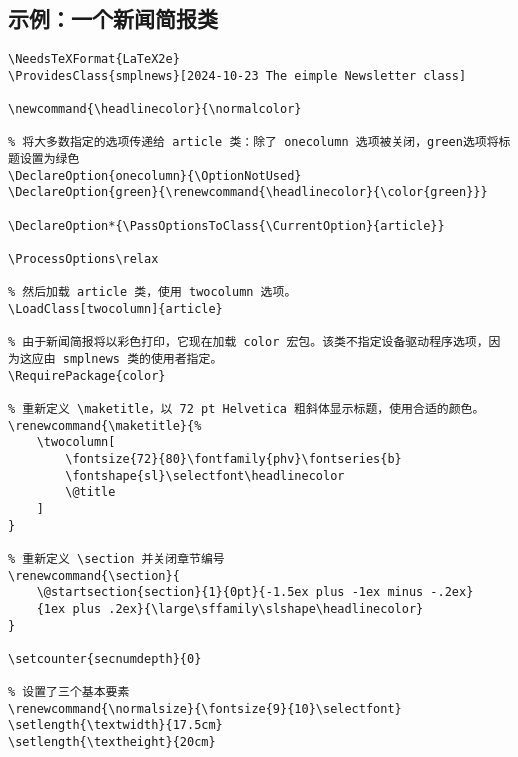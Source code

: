 \subsection{示例：一个新闻简报类}\label{subsec:cls-news}
\begin{lstlisting}
\NeedsTeXFormat{LaTeX2e}
\ProvidesClass{smplnews}[2024-10-23 The eimple Newsletter class]

\newcommand{\headlinecolor}{\normalcolor}

% 将大多数指定的选项传递给 article 类：除了 onecolumn 选项被关闭，green选项将标题设置为绿色
\DeclareOption{onecolumn}{\OptionNotUsed}
\DeclareOption{green}{\renewcommand{\headlinecolor}{\color{green}}}

\DeclareOption*{\PassOptionsToClass{\CurrentOption}{article}}

\ProcessOptions\relax

% 然后加载 article 类，使用 twocolumn 选项。
\LoadClass[twocolumn]{article}

% 由于新闻简报将以彩色打印，它现在加载 color 宏包。该类不指定设备驱动程序选项，因为这应由 smplnews 类的使用者指定。
\RequirePackage{color}

% 重新定义 \maketitle，以 72 pt Helvetica 粗斜体显示标题，使用合适的颜色。
\renewcommand{\maketitle}{%
    \twocolumn[
        \fontsize{72}{80}\fontfamily{phv}\fontseries{b}
        \fontshape{sl}\selectfont\headlinecolor
        \@title
    ]
}

% 重新定义 \section 并关闭章节编号
\renewcommand{\section}{
    \@startsection{section}{1}{0pt}{-1.5ex plus -1ex minus -.2ex}
    {1ex plus .2ex}{\large\sffamily\slshape\headlinecolor}
}

\setcounter{secnumdepth}{0}

% 设置了三个基本要素
\renewcommand{\normalsize}{\fontsize{9}{10}\selectfont}
\setlength{\textwidth}{17.5cm}
\setlength{\textheight}{20cm}
\end{lstlisting}

